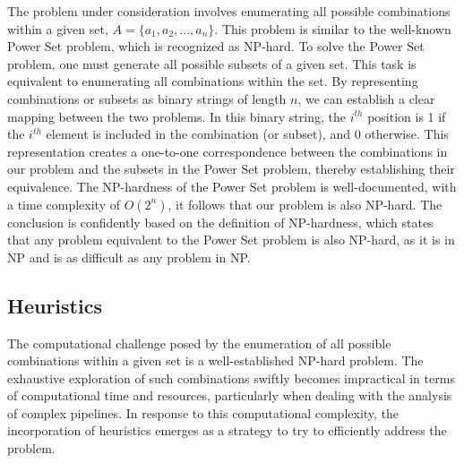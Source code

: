 The problem under consideration involves enumerating all possible combinations within a given set,
$A = \{a_1, a_2, ..., a_n\}$.
This problem is similar to the well-known Power Set problem, which is recognized as NP-hard.
To solve the Power Set problem, one must generate all possible subsets of a given set.
This task is equivalent to enumerating all combinations within the set.
By representing combinations or subsets as binary strings of length $n$,
we can establish a clear mapping between the two problems.
In this binary string, the $i^{th}$ position is 1 if the $i^{th}$ element is included in the combination (or subset), and 0 otherwise.
This representation creates a one-to-one correspondence between the combinations in our problem and the subsets in the Power Set problem,
thereby establishing their equivalence. The NP-hardness of the Power Set problem is well-documented, with a time complexity of $O(2^n)$,
it follows that our problem is also NP-hard.
The conclusion is confidently based on the definition of NP-hardness,
which states that any problem equivalent to the Power Set problem is also NP-hard,
as it is in NP and is as difficult as any problem in NP.

\subsection{Heuristics}
The computational challenge posed by the enumeration of all possible combinations within a given set is a well-established NP-hard problem.
The exhaustive exploration of such combinations swiftly becomes impractical in terms of computational time and resources,
particularly when dealing with the analysis of complex pipelines.
In response to this computational complexity,
the incorporation of heuristics emerges as a strategy to try to efficiently address the problem.

